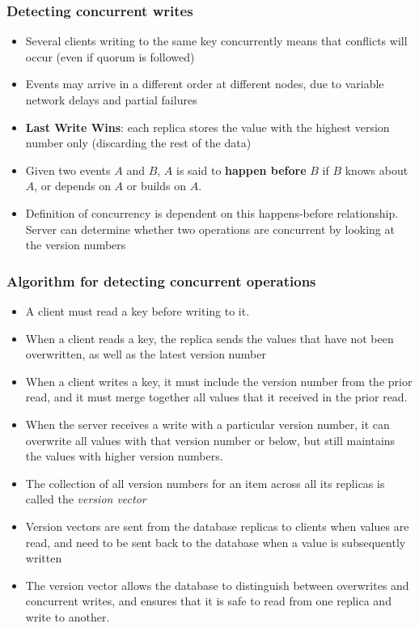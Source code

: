 \documentclass{article}
\begin{document}
\subsubsection{Detecting concurrent writes}
\begin{itemize}
    \item Several clients writing to the same key concurrently means that conflicts will occur (even if quorum is followed)
    
    \item Events may arrive in a different order at different nodes, due to variable network delays and partial failures
    
    \item \textbf{Last Write Wins}: each replica stores the value with the highest version number only (discarding the rest of the data)
    
    \item Given two events $A$ and $B$, $A$ is said to \textbf{happen before} $B$ if $B$ knows about $A$, or depends on $A$ or builds on $A$. 
    
    \item Definition of concurrency is dependent on this happens-before relationship. Server can determine whether two operations are concurrent by looking at the version numbers
\end{itemize}

\subsubsection{Algorithm for detecting concurrent operations}
\begin{itemize}
    \item A client must read a key before writing to it.
    
    \item When a client reads a key, the replica sends the values that have not been overwritten, as well as the latest version number
    
    \item When a client writes a key, it must include the version number from the prior read, and it must merge together all values that it received in the prior read.
    
    \item When the server receives a write with a particular version number, it can overwrite all values with that version number or below, but still maintains the values with higher version numbers. 
    
    \item The collection of all version numbers for an item across all its replicas is called the \textit{version vector}
    
    \item Version vectors are sent from the database replicas to clients when values are read, and need to be sent back to the database when a value is subsequently written
    
    \item The version vector allows the database to distinguish between overwrites and concurrent writes, and ensures that it is safe to read from one replica and write to another. 
\end{itemize}
\end{document}
